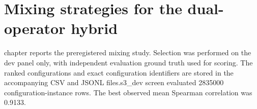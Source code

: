\chapter{Mixing strategies for the dual-operator hybrid}\n\label{ch:mixing}\n\nThis chapter reports the preregistered mixing study. Selection was performed on the dev panel only, with independent evaluation ground truth used for scoring. The ranked configurations and exact configuration identifiers are stored in the accompanying CSV and JSONL files.\n\nThe s3_dev screen evaluated 2835000 configuration-instance rows. The best observed mean Spearman correlation was 0.9133.\n